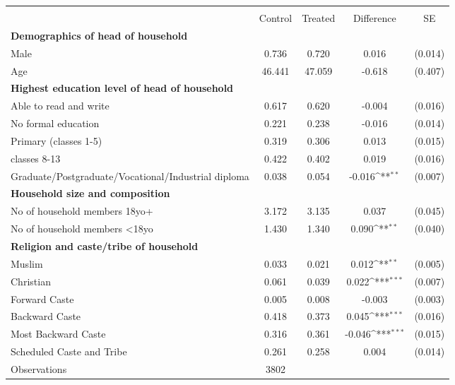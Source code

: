 {
\def\sym#1{\ifmmode^{#1}\else\(^{#1}\)\fi}
\begin{tabular}{l*{1}{cccc}}
\hline\hline
                    &\multicolumn{4}{c}{}                                        \\
                    &     Control&     Treated&  Difference         &          SE\\
\hline
\textbf{Demographics of head of household}&            &            &                     &            \\
Male                &       0.736&       0.720&       0.016         &     (0.014)\\
Age                 &      46.441&      47.059&      -0.618         &     (0.407)\\
\textbf{Highest education level of head of household}&            &            &                     &            \\
Able to read and write&       0.617&       0.620&      -0.004         &     (0.016)\\
No formal education &       0.221&       0.238&      -0.016         &     (0.014)\\
Primary (classes 1-5)&       0.319&       0.306&       0.013         &     (0.015)\\
classes 8-13        &       0.422&       0.402&       0.019         &     (0.016)\\
Graduate/Postgraduate/Vocational/Industrial diploma&       0.038&       0.054&      -0.016\sym{**} &     (0.007)\\
\textbf{Household size and composition}&            &            &                     &            \\
No of household members 18yo+&       3.172&       3.135&       0.037         &     (0.045)\\
No of household members <18yo&       1.430&       1.340&       0.090\sym{**} &     (0.040)\\
\textbf{Religion and caste/tribe of household}&            &            &                     &            \\
Muslim              &       0.033&       0.021&       0.012\sym{**} &     (0.005)\\
Christian           &       0.061&       0.039&       0.022\sym{***}&     (0.007)\\
Forward Caste       &       0.005&       0.008&      -0.003         &     (0.003)\\
Backward Caste      &       0.418&       0.373&       0.045\sym{***}&     (0.016)\\
Most Backward Caste &       0.316&       0.361&      -0.046\sym{***}&     (0.015)\\
Scheduled Caste and Tribe&       0.261&       0.258&       0.004         &     (0.014)\\
\hline
Observations        &        3802&            &                     &            \\
\hline\hline
\end{tabular}
}
